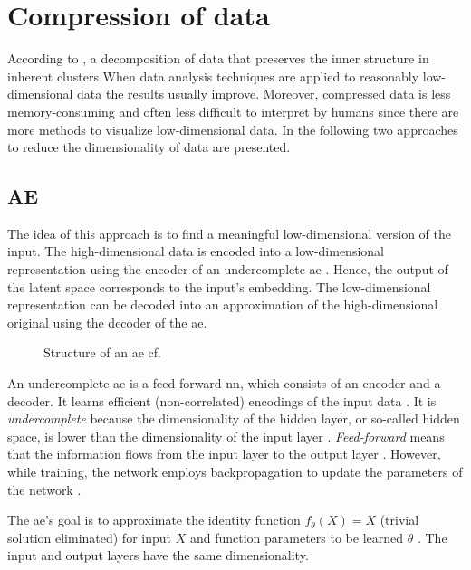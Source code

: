 \section{Compression of data}\label{sec:compression}

According to \citeauthor{clusteringDocs2020}, a decomposition of data that preserves the inner structure in inherent clusters 
When data analysis techniques are applied to reasonably low-dimensional data the results usually improve.
Moreover, compressed data is less memory-consuming and often less difficult to interpret by humans 
since there are more methods to visualize low-dimensional data.
In the following two approaches to reduce the dimensionality of data are presented.

\subsection{AE}\label{subsec:autoencoder}

The idea of this approach is to find a meaningful low-dimensional version of the input.
The high-dimensional data is encoded into a low-dimensional representation using the encoder of an undercomplete \ac{ae} \cite{autoencoder2020}.
Hence, the output of the latent space corresponds to the input's embedding. 
The low-dimensional representation can be decoded into an approximation of the high-dimensional original using the decoder of the \ac{ae}.

\begin{figure}[h] %
    \centering
    
    \caption[Structure of an \ac{ae}]
    {Structure of an \ac{ae} cf. \cite{autoencoder2020}}
    \label{fig:ae}
\end{figure}

An undercomplete \ac{ae} is a feed-forward \ac{nn}, which consists of an encoder and a decoder.
It learns efficient (non-correlated) encodings of the input data \cite{autoencoder2020}.
It is \textit{undercomplete} because the dimensionality of the hidden layer, or so-called hidden space, 
is lower than the dimensionality of the input layer \cite{seminar_ies}.
\textit{Feed-forward} means that the information flows from the input layer to the output layer \cite{seminar_ies}.
However, while training, the network employs backpropagation to update the parameters of the network \cite{seminar_ies}.

The \ac{ae}'s goal is to approximate the identity function $f_\theta(X) = X$ (trivial solution eliminated) for input $X$ and 
function parameters to be learned $\theta$ \cite{seminar_ies}.
The input and output layers have the same dimensionality.


